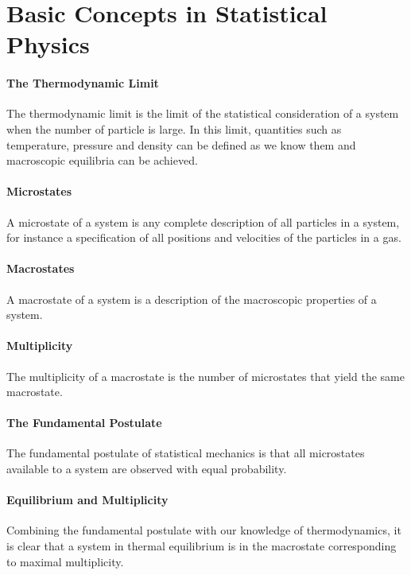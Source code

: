 \section{Basic Concepts in Statistical Physics}

\paragraph{The Thermodynamic Limit}
The thermodynamic limit is the limit of the statistical consideration of a system when the number of particle is large. In this limit, quantities such as temperature, pressure and density can be defined as we know them and macroscopic equilibria can be achieved.

\paragraph{Microstates}
A microstate of a system is any complete description of all particles in a system, for instance a specification of all positions and velocities of the particles in a gas.

\paragraph{Macrostates}
A macrostate of a system is a description of the macroscopic properties of a system.

\paragraph{Multiplicity}
The multiplicity of a macrostate is the number of microstates that yield the same macrostate.

\paragraph{The Fundamental Postulate}
The fundamental postulate of statistical mechanics is that all microstates available to a system are observed with equal probability.

\paragraph{Equilibrium and Multiplicity}
Combining the fundamental postulate with our knowledge of thermodynamics, it is clear that a system in thermal equilibrium is in the macrostate corresponding to maximal multiplicity.